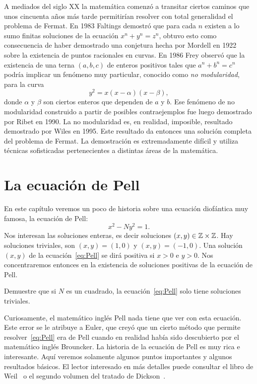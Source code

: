 A mediados del siglo XX la matemática comenzó a transitar ciertos caminos que
unos cincuenta años más tarde permitirían resolver con total generalidad el
problema de Fermat. En 1983 Faltings demostró que para cada $n$ existen a lo
sumo finitas soluciones de la ecuación $x^n+y^n=z^n$, obtuvo esto como
consecuencia de haber demostrado una conjetura hecha por Mordell en 1922 sobre
la existencia de puntos racionales en curvas. En 1986 Frey observó que la
existencia de una terna $(a,b,c)$ de enteros positivos tales que $a^n+b^n=c^n$
podría implicar un fenómeno muy particular, conocido como \emph{no
modularidad}, para la curva
\[
	y^2=x(x-\alpha)(x-\beta),
\]
donde $\alpha$ y $\beta$ son ciertos enteros que dependen de $a$ y $b$. 
Ese fenómeno de no modularidad construido a partir de posibles
contraejemplos fue luego demostrado por Ribet en 1990. La no modularidad es, en
realidad, imposible, resultado demostrado por Wiles en 1995.  Este resultado da
entonces una solución completa del problema de Fermat.
La demostración es extremadamente difícil y utiliza
técnicas sofisticadas pertenecientes a distintas áreas de la matemática.  

\section*{La ecuación de Pell}

En este capítulo veremos un poco de historia sobre una ecuación diofántica muy
famosa, la ecuación de Pell:
\begin{equation}
	\label{eq:Pell}
	x^2-Ny^2=1.
\end{equation}
Nos interesan las soluciones enteras, es decir soluciones $(x,y)\in\mathbb{Z}\times\mathbb{Z}$.
Hay soluciones triviales, son $(x,y)=(1,0)$ y $(x,y)=(-1,0)$. Una solución
$(x,y)$ de la ecuación~\eqref{eq:Pell} se dirá positiva si $x>0$ e $y>0$. Nos
concentraremos entonces en la existencia de soluciones positivas de la ecuación
de Pell.

\begin{exercise}
	Demuestre que si $N$ es un cuadrado, la ecuación~\eqref{eq:Pell} solo
	tiene soluciones triviales.
\end{exercise}

Curiosamente, el matemático inglés Pell nada tiene que ver con esta ecuación.
Este error se le atribuye a Euler, que creyó que un cierto método que permite
resolver~\eqref{eq:Pell} era de Pell cuando en realidad había sido descubierto
por el matemático inglés Brouncker.  La historia de la ecuación de Pell es muy
rica e interesante. Aquí veremos solamente algunos puntos importantes y algunos
resultados básicos. El lector interesado en más detalles puede consultar el
libro de Weil~\cite{MR734177} o el segundo volumen del tratado de
Dickson~\cite{MR0245500}.

